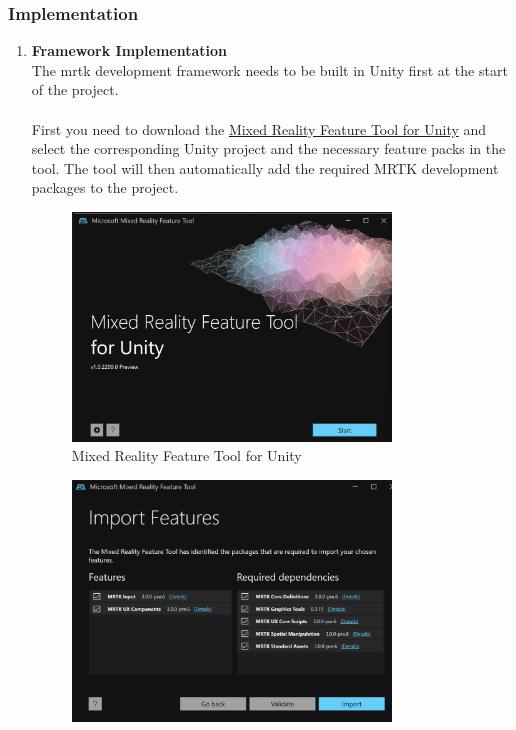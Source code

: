 \documentclass[12pt]{article}
\begin{document}
\begin{enumerate}
\end{enumerate}
\subsubsection{Implementation}
\label{sec:implementation}
\begin{enumerate}
      \item \textbf{Framework Implementation}
      \\
      The \gls{mrtk} development framework needs to be built in Unity first at the start of the project.
      \\\\
      First you need to download the \href{https://learn.microsoft.com/en-us/windows/mixed-reality/develop/unity/welcome-to-mr-feature-tool}{Mixed Reality Feature Tool for Unity} and select the corresponding Unity project and the necessary feature packs in the tool. The tool will then automatically add the required MRTK development packages to the project\cite{mrtk_m}.
      \begin{figure}[H]
            \centering
            \includegraphics[width=0.8\textwidth]{mrtk1.png}
            \caption{Mixed Reality Feature Tool for Unity\cite{mrtk_m}}
      \end{figure}
      \begin{figure}[H]
            \centering
            \includegraphics[width=0.8\textwidth]{mrtk2.png}

\end{figure}
\end{enumerate}
\end{document}
